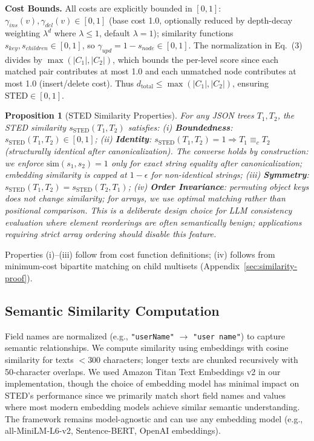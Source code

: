 \documentclass{article}
\theoremstyle{plain}
\newtheorem{proposition}[theorem]{Proposition}
\theoremstyle{definition}
\begin{document}
\textbf{Cost Bounds.} All costs are explicitly bounded in $[0, 1]$: $\gamma_{ins}(v), \gamma_{del}(v) \in [0, 1]$ (base cost 1.0, optionally reduced by depth-decay weighting $\lambda^d$ where $\lambda \leq 1$, default $\lambda = 1$); similarity functions $s_{key}, s_{children} \in [0,1]$, so $\gamma_{upd} = 1 - s_{node} \in [0, 1]$. The normalization in Eq.~(3) divides by $\max(|C_1|, |C_2|)$, which bounds the per-level score since each matched pair contributes at most 1.0 and each unmatched node contributes at most 1.0 (insert/delete cost). Thus $d_{\text{total}} \leq \max(|C_1|, |C_2|)$, ensuring $\text{STED} \in [0,1]$.

\begin{proposition}[STED Similarity Properties]
\label{thm:similarity}
For any JSON trees $T_1, T_2$, the STED similarity $s_{\text{STED}}(T_1, T_2)$ satisfies: (i) \textbf{Boundedness}: $s_{\text{STED}}(T_1, T_2) \in [0, 1]$; (ii) \textbf{Identity}: $s_{\text{STED}}(T_1, T_2) = 1 \Rightarrow T_1 \equiv_c T_2$ (structurally identical after canonicalization). The converse holds by construction: we enforce $\text{sim}(s_1, s_2) = 1$ \emph{only} for exact string equality after canonicalization; embedding similarity is capped at $1 - \epsilon$ for non-identical strings; (iii) \textbf{Symmetry}: $s_{\text{STED}}(T_1, T_2) = s_{\text{STED}}(T_2, T_1)$; (iv) \textbf{Order Invariance}: permuting object keys does not change similarity; for arrays, we use optimal matching rather than positional comparison. This is a deliberate design choice for LLM consistency evaluation where element reorderings are often semantically benign; applications requiring strict array ordering should disable this feature.
\end{proposition}

Properties (i)--(iii) follow from cost function definitions; (iv) follows from minimum-cost bipartite matching on child multisets (Appendix~\ref{sec:similarity-proof}).

\subsection{Semantic Similarity Computation}

Field names are normalized (e.g., \texttt{"userName"} $\rightarrow$ \texttt{"user name"}) to capture semantic relationships. We compute similarity using embeddings with cosine similarity for texts $<300$ characters; longer texts are chunked recursively with 50-character overlaps. We used Amazon Titan Text Embeddings v2 in our implementation, though the choice of embedding model has minimal impact on STED's performance since we primarily match short field names and values where most modern embedding models achieve similar semantic understanding. The framework remains model-agnostic and can use any embedding model (e.g., all-MiniLM-L6-v2, Sentence-BERT, OpenAI embeddings).
\end{document}
